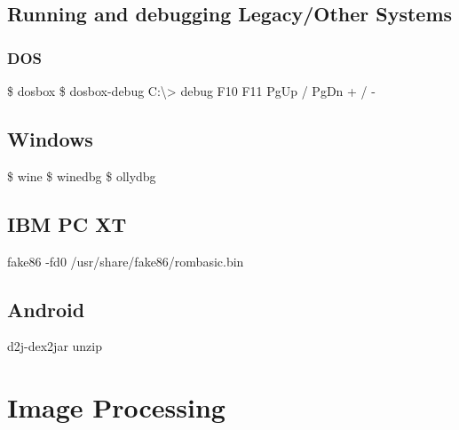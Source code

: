 \documentclass{refcard}
\begin{document}


\subsection{Running and debugging Legacy/Other Systems}

\subsubsection{DOS}

\begin{ldesc}
	 \$ dosbox 
	                   \$ dosbox-debug 
	       C:\textbackslash> debug 
	     F10
	     F11
	 PgUp / PgDn
	 + / -
\end{ldesc}

\subsection{Windows}

\begin{ldesc}
	   \$ wine 
	 \$ winedbg 
	 \$ ollydbg 
\end{ldesc}

\subsection{IBM PC XT}

\begin{ldesc}
	 fake86 -fd0 /usr/share/fake86/rombasic.bin
\end{ldesc}


\subsection{Android}

\begin{ldesc}
	   d2j-dex2jar 
	 unzip 
\end{ldesc}

\section{Image Processing}
\end{document}

